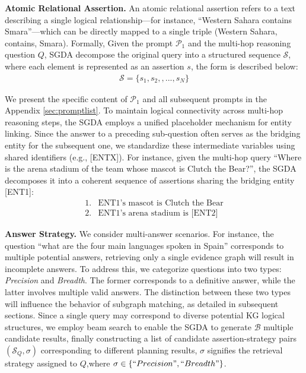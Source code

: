 \documentclass[11pt]{article}
\begin{document}
\textbf{Atomic Relational Assertion.} An atomic relational assertion refers to a text describing a single logical relationship—for instance, ``Western Sahara contains Smara''—which can be directly mapped to a single triple (Western Sahara, contains, Smara). Formally, Given the prompt \hyperref[fig:p1]{$ \mathcal{P}_1 $} and the multi-hop reasoning  question $Q$, SGDA decompose the original query into a structured sequence \( \mathcal{S} \), where each element is represented as an assertion $s$, the form is described below: 
\begin{align}
\mathcal{S} = \{ s_1, s_2, , ... , s_N \}
\end{align}

We present the specific content of $\mathcal{P}_1$ and all subsequent prompts in the Appendix \ref{sec:promptlist}. To maintain logical connectivity across multi-hop reasoning steps, the SGDA employs a unified placeholder mechanism for entity linking. Since the answer to a preceding sub-question often serves as the bridging entity for the subsequent one, we standardize these intermediate variables using shared identifiers (e.g., [ENTX]). For instance, given the multi-hop query ``Where is the arena stadium of the team whose mascot is Clutch the Bear?'', the SGDA decomposes it into a coherent sequence of assertions sharing the bridging entity [ENT1]:
\begin{align*}
1. & \text{ENT1}\text{'s mascot is Clutch the Bear} \\
2. & \text{ENT1}\text{'s arena stadium is [ENT2]}
\end{align*}

\textbf{Answer Strategy.} We consider multi-answer scenarios. For instance, the question ``what are the four main languages spoken in Spain'' corresponds to multiple potential answers, retrieving only a single evidence graph will result in incomplete answers. To address this, we categorize questions into two types: \textit{Precision} and \textit{Breadth}. The former corresponds to a definitive answer, while the latter involves multiple valid answers. The distinction between these two types will influence the behavior of subgraph matching, as detailed in subsequent sections. Since a single query may correspond to diverse potential KG logical structures, we employ beam search to enable the SGDA to generate \( \mathcal{B} \) multiple candidate results, finally constructing a list of candidate assertion-strategy pairs $(\mathcal{S}_Q, \sigma)$ corresponding to different planning results, $\sigma$ signifies the retrieval strategy assigned to $Q$,where $\sigma \in \{``Precision", ``Breadth"\}$.
\end{document}
